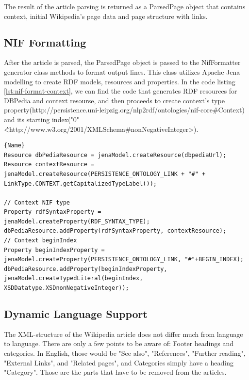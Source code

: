 \documentclass[thesis=M,english,hidelinks]{FITthesis}[2019/12/23]
\begin{document}
The result of the article parsing is returned as a ParsedPage object that contains context, initial Wikipedia's page data and page structure with links.

\subsection{NIF Formatting}

After the article is parsed, the ParsedPage object is passed to the NifFormatter generator class methods to format output lines. This class utilizes Apache Jena modelling to create \gls{RDF} models, resources and properties. In the code listing \ref{lst:nif-format-context}, we can find the code that generates \gls{RDF} resources for DBPedia and context resourse, and then proceeds to create context's type property(http://persistence.uni-leipzig.org/nlp2rdf/ontologies/nif-core\#Context) and its starting index("0"\^\^<http://www.w3.org/2001/XMLSchema\#nonNegativeInteger>).

\begin{lstlisting}[caption=Generating Apache Jena context model,frame=tlrb,  label = {lst:nif-format-context}]{Name}
Resource dbPediaResource = jenaModel.createResource(dbpediaUrl);
Resource contextResource = jenaModel.createResource(PERSISTENCE_ONTOLOGY_LINK + "#" + LinkType.CONTEXT.getCapitalizedTypeLabel());

// Context NIF type
Property rdfSyntaxProperty = jenaModel.createProperty(RDF_SYNTAX_TYPE);
dbPediaResource.addProperty(rdfSyntaxProperty, contextResource);
// Context beginIndex
Property beginIndexProperty = jenaModel.createProperty(PERSISTENCE_ONTOLOGY_LINK, "#"+BEGIN_INDEX);
dbPediaResource.addProperty(beginIndexProperty, jenaModel.createTypedLiteral(beginIndex, XSDDatatype.XSDnonNegativeInteger));
\end{lstlisting}


\subsection{Dynamic Language Support}\label{dynamic_lang_support}

The XML-structure of the Wikipedia article does not differ much from language to language. There are only a few points to be aware of: Footer headings and categories. In English, those would be "See also", "References", "Further reading", "External Links", and "Related pages", and Categories simply have a heading "Category". Those are the parts that have to be removed from the articles.
\end{document}
